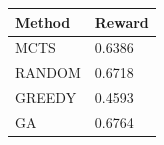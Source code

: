 \begin{tabular}{ll}
\hline
Method & Reward \\
\hline
  MCTS & 0.6386 \\
  RANDOM & 0.6718 \\
  GREEDY & 0.4593 \\
  GA & 0.6764 \\
\hline
\end{tabular}
